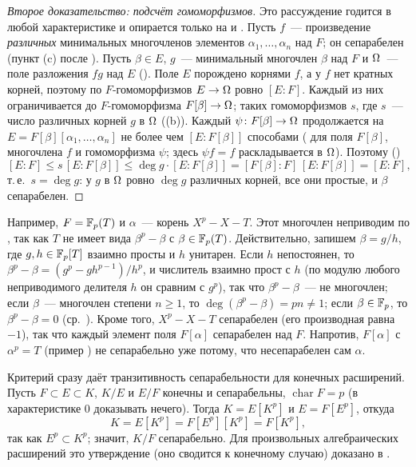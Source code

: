 \begin{proof}[Второе доказательство: подсчёт гомоморфизмов]
Это рассуждение годится в любой характеристике и опирается только на  и . Пусть $f$~--- произведение
\emph{различных} минимальных многочленов элементов $\alpha_1,\dots,\alpha_n$ над $F$; он сепарабелен (пункт (c) после
). Пусть $\beta\in E$, $g$~--- минимальный многочлен $\beta$ над $F$ и $\Omega$~--- поле разложения $fg$ над $E$
(). Поле $E$ порождено корнями $f$, а у $f$ нет кратных корней, поэтому по  $F$-гомоморфизмов
$E\to\Omega$ ровно $[E:F]$. Каждый из них ограничивается до $F$-гомоморфизма $F[\beta]\to\Omega$; таких гомоморфизмов $s$,
где $s$~--- число различных корней $g$ в $\Omega$ ((b)). Каждый $\psi\colon F[\beta]\to\Omega$ продолжается на
$E=F[\beta][\alpha_1,\dots,\alpha_n]$ не более чем $[E:F[\beta]]$ способами ( для поля $F[\beta]$, многочлена
$f$ и гомоморфизма $\psi$; здесь $\psi f=f$ раскладывается в $\Omega$). Поэтому ()
\[
[E:F]\le s\,[E:F[\beta]]\le\deg g\cdot[E:F[\beta]]=[F[\beta]:F]\,[E:F[\beta]]=[E:F],
\]
т.\,е.\ $s=\deg g$: у $g$ в $\Omega$ ровно $\deg g$ различных корней, все они простые, и $\beta$ сепарабелен.
\end{proof}

Например, $F=\mathbb F_p(T)$ и $\alpha$~--- корень $X^p-X-T$. Этот многочлен неприводим по , так как $T$ не имеет
вида $\beta^p-\beta$ с $\beta\in\mathbb F_p(T)$. Действительно, запишем $\beta=g/h$, где $g,h\in\mathbb F_p[T]$ взаимно просты и $h$
унитарен. Если $h$ непостоянен, то $\beta^p-\beta=(g^p-gh^{p-1})/h^p$, и числитель взаимно прост с $h$ (по модулю любого
неприводимого делителя $h$ он сравним с $g^p$), так что $\beta^p-\beta$~--- не многочлен; если $\beta$~--- многочлен
степени $n\ge1$, то $\deg(\beta^p-\beta)=pn\ne1$; если $\beta\in\mathbb F_p$, то $\beta^p-\beta=0$ (ср.\ ). Кроме того,
$X^p-X-T$ сепарабелен (его производная равна $-1$), так что каждый элемент поля $F[\alpha]$ сепарабелен над $F$.
Напротив, $F[\alpha]$ с $\alpha^p=T$ (пример ) не сепарабельно уже потому, что несепарабелен сам $\alpha$.

\begin{remark}[2.22h: транзитивность]
Критерий  сразу даёт транзитивность сепарабельности для конечных расширений. Пусть $F\subset E\subset K$,
$K/E$ и $E/F$ конечны и сепарабельны, $\operatorname{char}F=p$ (в характеристике $0$ доказывать нечего). Тогда $K=E[K^p]$ и $E=F[E^p]$, откуда
\[
K=E[K^p]=F[E^p][K^p]=F[K^p],
\]
так как $E^p\subset K^p$; значит, $K/F$ сепарабельно. Для произвольных алгебраических расширений это утверждение (оно
сводится к конечному случаю) доказано в .
\end{remark}

